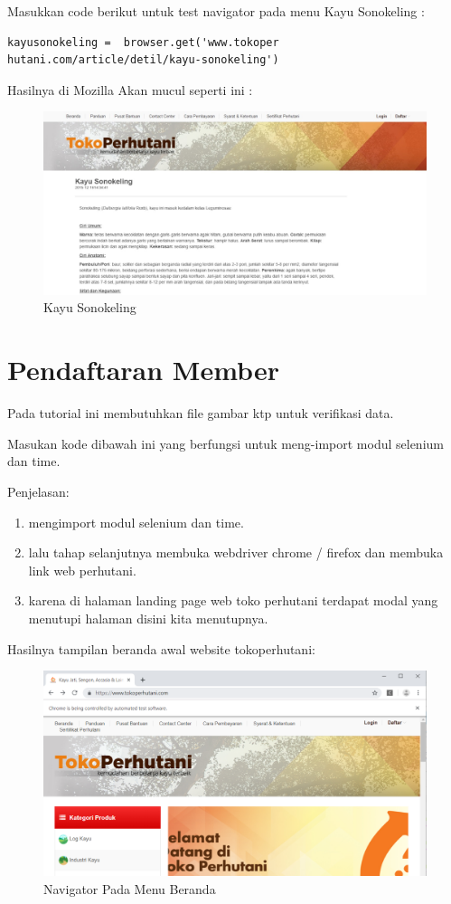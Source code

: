 Masukkan code berikut untuk test navigator pada menu Kayu Sonokeling :
\begin{verbatim}
kayusonokeling =  browser.get('www.tokoper
hutani.com/article/detil/kayu-sonokeling')
\end{verbatim}

Hasilnya  di Mozilla Akan mucul seperti ini :
\begin{figure}[h]
	\centering
	\includegraphics[scale=0.25]{figures/j3}
	\caption{Kayu Sonokeling}
\end{figure}

\newpage
\section{Pendaftaran Member}
Pada tutorial ini membutuhkan file gambar ktp untuk verifikasi data.

Masukan kode dibawah ini yang berfungsi untuk meng-import modul selenium dan time.



Penjelasan:
\begin{enumerate}
	\item mengimport modul selenium dan time.
	\item lalu tahap selanjutnya membuka webdriver chrome / firefox dan membuka link web perhutani.
	\item karena di halaman landing page web toko perhutani terdapat modal yang menutupi halaman disini kita menutupnya.
\end{enumerate}

\pagebreak
Hasilnya tampilan beranda awal website tokoperhutani:


\begin{figure}[h]
	\centering
	\includegraphics[scale=0.425]{figures/1home}
	\caption{Navigator Pada Menu Beranda}
\end{figure}

